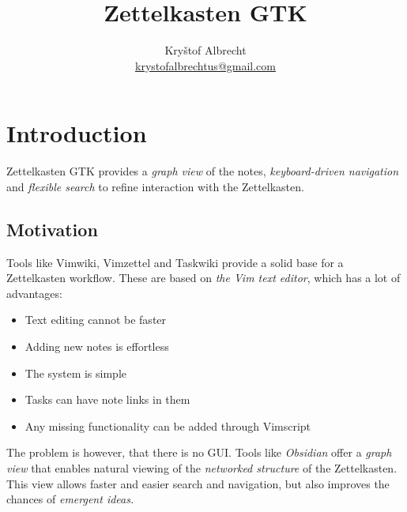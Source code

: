\documentclass{article}
\title{Zettelkasten GTK}
\author{Kryštof Albrecht \\ \href{mailto:krystofalbrechtus@gmail.com}{krystofalbrechtus@gmail.com}}
\begin{document}
\maketitle
\tableofcontents

\newpage

\section{Introduction}

Zettelkasten GTK provides a \emph{graph view} of the notes, \emph{keyboard-driven navigation} and \emph{flexible search} to refine interaction with the Zettelkasten.

\subsection{Motivation}

Tools like Vimwiki, Vimzettel and Taskwiki provide a solid base for a Zettelkasten workflow. These are based on \emph{the Vim text editor}, which has a lot of advantages:

\begin{itemize}
	\item Text editing cannot be faster
	
	\item Adding new notes is effortless

	\item The system is simple

	\item Tasks can have note links in them

	\item Any missing functionality can be added through Vimscript
\end{itemize}

The problem is however, that there is no GUI. Tools like \emph{Obsidian} offer a \emph{graph view} that enables natural viewing of the \emph{networked structure} of the Zettelkasten. This view allows faster and easier search and navigation, but also improves the chances of \emph{emergent ideas.}
\end{document}
